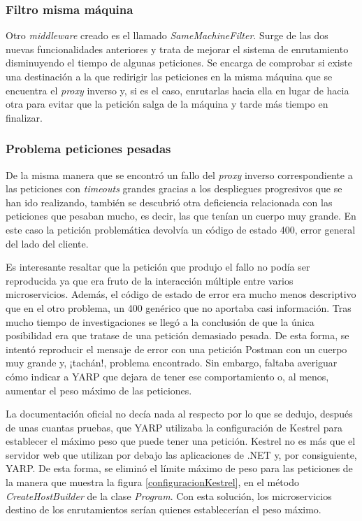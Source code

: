 \documentclass[11pt,spanish,listoffigures]{tfgetsinf}
\begin{document}

			\subsubsection{Filtro misma máquina}

Otro \emph{middleware} creado es el llamado \emph{SameMachineFilter}. Surge de las dos nuevas funcionalidades anteriores y trata de mejorar el sistema de enrutamiento disminuyendo el tiempo de algunas peticiones. Se encarga de comprobar si existe una destinación a la que redirigir las peticiones en la misma máquina que se encuentra el \emph{proxy} inverso y, si es el caso, enrutarlas hacia ella en lugar de hacia otra para evitar que la petición salga de la máquina y tarde más tiempo en finalizar.


			\subsubsection{Problema peticiones pesadas}

De la misma manera que se encontró un fallo del \emph{proxy} inverso correspondiente a las peticiones con \emph{timeouts} grandes gracias a los despliegues progresivos que se han ido realizando, también se descubrió otra deficiencia relacionada con las peticiones que pesaban mucho, es decir, las que tenían un cuerpo muy grande. En este caso la petición problemática devolvía un código de estado 400, error general del lado del cliente.

Es interesante resaltar que la petición que produjo el fallo no podía ser reproducida ya que era fruto de la interacción múltiple entre varios microservicios. Además, el código de estado de error era mucho menos descriptivo que en el otro problema, un 400 genérico que no aportaba casi información. Tras mucho tiempo de investigaciones se llegó a la conclusión de que la única posibilidad era que tratase de una petición demasiado pesada. De esta forma, se intentó reproducir el mensaje de error con una petición Postman con un cuerpo muy grande y, ¡tachán!, problema encontrado. Sin embargo, faltaba averiguar cómo indicar a YARP que dejara de tener ese comportamiento o, al menos, aumentar el peso máximo de las peticiones.

La documentación oficial no decía nada al respecto por lo que se dedujo, después de unas cuantas pruebas, que YARP utilizaba la configuración de Kestrel \cite{Kestrel} para establecer el máximo peso que puede tener una petición. Kestrel no es más que el servidor web que utilizan por debajo las aplicaciones de .NET y, por consiguiente, YARP. De esta forma, se eliminó el límite máximo de peso para las peticiones de la manera que muestra la figura \ref{configuracionKestrel}, en el método \emph{CreateHostBuilder} de la clase \emph{Program}. Con esta solución, los microservicios destino de los enrutamientos serían quienes establecerían el peso máximo.
\end{document}

